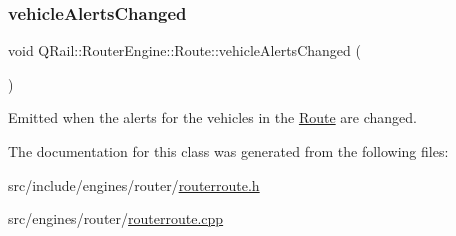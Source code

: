 \mbox{\label{classQRail_1_1RouterEngine_1_1Route_a236daca39e2006e3f0182227079113f6}} 
\subsubsection{\texorpdfstring{vehicleAlertsChanged}{vehicleAlertsChanged}}
{\footnotesize\ttfamily void Q\+Rail\+::\+Router\+Engine\+::\+Route\+::vehicle\+Alerts\+Changed (\begin{DoxyParamCaption}{ }\end{DoxyParamCaption})\hspace{0.3cm}{\ttfamily [signal]}}



Emitted when the alerts for the vehicles in the \mbox{\hyperlink{classQRail_1_1RouterEngine_1_1Route}{Route}} are changed. 



The documentation for this class was generated from the following files\+:\begin{DoxyCompactItemize}
\item 
src/include/engines/router/\mbox{\hyperlink{routerroute_8h}{routerroute.\+h}}\item 
src/engines/router/\mbox{\hyperlink{routerroute_8cpp}{routerroute.\+cpp}}\end{DoxyCompactItemize}
